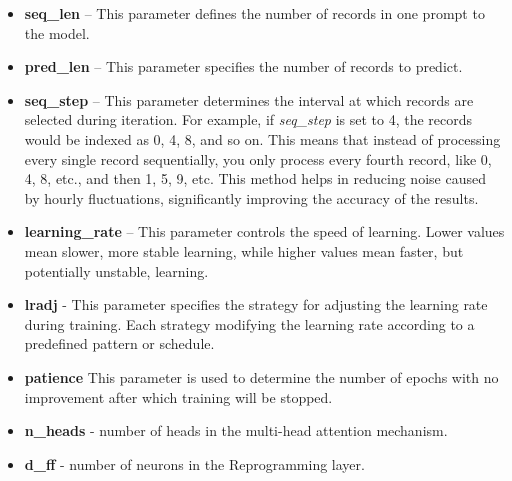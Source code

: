\begin{itemize}
	\item \textbf{seq\_len} – This parameter defines the number of records in one prompt to the model.
	\item \textbf{pred\_len} – This parameter specifies the number of records to predict.
	\item \textbf{seq\_step} – This parameter determines the interval at which records are selected during iteration. For example, if \textit{seq\_step} is set to 4, the records would be indexed as 0, 4, 8, and so on. This means that instead of processing every single record sequentially, you only process every fourth record, like 0, 4, 8, etc., and then 1, 5, 9, etc. This method helps in reducing noise caused by hourly fluctuations, significantly improving the accuracy of the results.
	\item \textbf{learning\_rate} – This parameter controls the speed of learning. Lower values mean slower, more stable learning, while higher values mean faster, but potentially unstable, learning.
	\item \textbf{lradj} - This parameter specifies the strategy for adjusting the learning rate during training. Each strategy modifying the learning rate according to a predefined pattern or schedule.
  \item \textbf{patience}   This parameter is used to determine the number of epochs with no improvement after which training will be stopped.
	\item \textbf{n\_heads} - number of heads in the multi-head attention mechanism.
	\item \textbf{d\_ff} - number of neurons in the Reprogramming layer.
\end{itemize}

